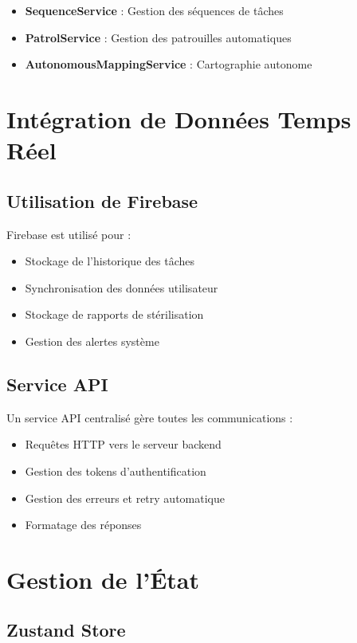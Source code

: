 \documentclass[12pt,a4paper,oneside]{report}
\begin{document}
\begin{itemize}
  \item \textbf{SequenceService} : Gestion des séquences de tâches
  \item \textbf{PatrolService} : Gestion des patrouilles automatiques
  \item \textbf{AutonomousMappingService} : Cartographie autonome
\end{itemize}

\section{Intégration de Données Temps Réel}

\subsection{Utilisation de Firebase}

Firebase est utilisé pour :

\begin{itemize}
  \item Stockage de l'historique des tâches
  \item Synchronisation des données utilisateur
  \item Stockage de rapports de stérilisation
  \item Gestion des alertes système
\end{itemize}

\subsection{Service API}

Un service API centralisé gère toutes les communications :

\begin{itemize}
  \item Requêtes HTTP vers le serveur backend
  \item Gestion des tokens d'authentification
  \item Gestion des erreurs et retry automatique
  \item Formatage des réponses
\end{itemize}

\section{Gestion de l'État}

\subsection{Zustand Store}
\end{document}
